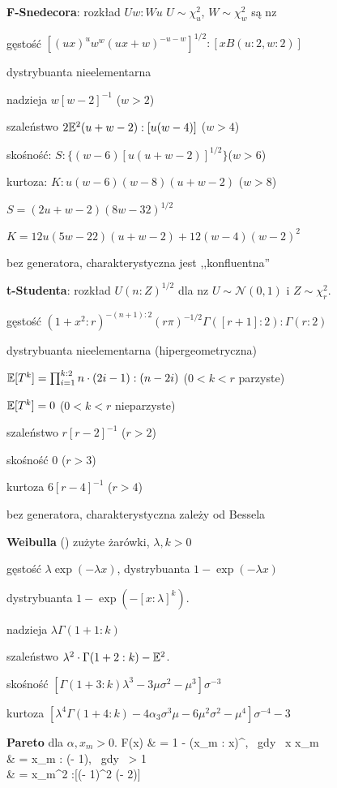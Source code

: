 \begin{multicols*}{3}
\textbf{F-Snedecora}: rozkład $Uw : Wu$ \dotfill $U \sim \chi^2_u$, $W \sim \chi^2_w$ są nz
\begin{enumx}
\item gęstość $[(ux)^u w^w (ux + w)^{-u-w}]^{1/2} : [x B(u:2, w:2)]$
\item dystrybuanta nieelementarna
\item nadzieja $w [w-2]^{-1}$ \hfill ($w > 2$)
\item szaleństwo $2 \mathbb{E}^2 (u+w - 2) : [u(w-4)]$ \hfill ($w > 4$)
\item skośność: $S : \{(w-6) [u (u+w -2)]^{1/2}\}$\hfill ($w > 6$)
\item kurtoza: $K : u(w-6)(w-8)(u+w-2)$ \hfill ($w > 8$)
\item $S = (2 u+w - 2) (8w - 32)^{1/2}$
\item $K = 12 u(5w-22)(u+w-2)+12(w-4)(w-2)^2$
\item bez generatora, charakterystyczna jest ,,konfluentna''
\end{enumx}

\textbf{t-Studenta}: rozkład $U (n : Z)^{1/2}$ dla nz $U \sim \mathcal N(0, 1)$ i $Z \sim \chi^2_r$.
\begin{enumx}
\item gęstość $(1 + x^2 : r)^{-(n+1):2} (r\pi)^{-1/2} \Gamma([r+1]:2) : \Gamma(r:2)$
\item dystrybuanta nieelementarna (hipergeometryczna)
\item $\mathbb{E} [T^k] = \prod_{i=1}^{k:2} n \cdot (2i - 1): (n - 2i)$ \hfill ($0 < k < r$ parzyste)
\item $\mathbb{E} [T^k] = 0$ \hfill ($0 < k < r$ nieparzyste)
\item szaleństwo $r [r-2]^{-1}$ \hfill ($r > 2$)
\item skośność $0$ \hfill ($r > 3$)
\item kurtoza $6[r - 4]^{-1}$ \hfill ($r > 4$)
\item bez generatora, charakterystyczna zależy od Bessela
\end{enumx}

\textbf{Weibulla} () \dotfill zużyte żarówki, $\lambda, k > 0$
\begin{enumx}
\item gęstość $\lambda \exp(- \lambda x)$, dystrybuanta $1 - \exp (- \lambda x)$
\item dystrybuanta $1 - \exp(-[x:\lambda]^k)$.
\item nadzieja $\lambda \Gamma ( 1 + 1:k)$
\item szaleństwo $\lambda^2 \cdot \Gamma (1 + 2 : k ) - \mathbb{E}^2$.
\item skośność $[\Gamma(1 + 3:k) \lambda^3 - 3 \mu \sigma^2 - \mu^3]\sigma^{-3}$
\item kurtoza $[\lambda^4\Gamma(1+4 : k)-4\alpha_3 \sigma^3\mu-6\mu^2\sigma^2-\mu^4] \sigma^{-4} - 3$
\end{enumx}
\end{multicols*}


\textbf{Pareto} dla $\alpha, x_m > 0$.
F(x) & = 1 - (x_m : x)^\alpha, \mbox{ gdy } x \ge x_m \\
\expected & = \alpha x_m : (\alpha - 1), \mbox{ gdy } \alpha > 1\\
\variance & = x_m^2 \alpha :[(\alpha - 1)^2 (\alpha - 2)]